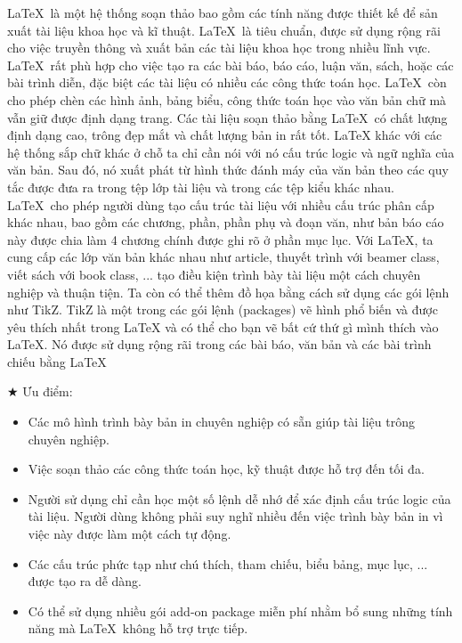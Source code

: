 \documentclass[12pt,a4paper]{report}
\begin{document}
    \LaTeX\  là một hệ thống soạn thảo bao gồm các tính năng được thiết kế để sản xuất tài liệu khoa học và kĩ thuật. \LaTeX\  là tiêu chuẩn, được sử dụng rộng rãi cho việc truyền thông và xuất bản các tài liệu khoa học trong nhiều lĩnh vực.
    \LaTeX\  rất phù hợp cho việc tạo ra các bài báo, báo cáo, luận văn, sách, hoặc các bài trình diễn, đặc biệt các tài liệu có nhiều các công thức toán học. \LaTeX\  còn cho phép chèn các hình ảnh, bảng biểu, công thức toán học vào văn bản chữ mà vẫn giữ được định dạng trang. Các tài liệu soạn thảo bằng \LaTeX\  có chất lượng định dạng cao, trông đẹp mắt và chất lượng bản in rất tốt.
    LaTeX khác với các hệ thống sắp chữ khác ở chỗ ta chỉ cần nói với nó cấu trúc logic và ngữ nghĩa của văn bản. Sau đó, nó xuất phát từ hình thức đánh máy của văn bản theo các quy tắc được đưa ra trong tệp lớp tài liệu và trong các tệp kiểu khác nhau. \LaTeX\  cho phép người dùng tạo cấu trúc tài liệu với nhiều cấu trúc phân cấp khác nhau, bao gồm các chương, phần, phần phụ và đoạn văn, như bản báo cáo này được chia làm 4 chương chính được ghi rõ ở phần mục lục. 
    Với \LaTeX, ta cung cấp các lớp văn bản khác nhau như article, thuyết trình với beamer class, viết sách với book class, ... tạo điều kiện trình bày tài liệu một cách chuyên nghiệp và thuận tiện. Ta còn có thể thêm đồ họa bằng cách sử dụng các gói lệnh như TikZ. TikZ là một trong các gói lệnh (packages) vẽ hình phổ biến và được yêu thích nhất trong LaTeX và có thể cho bạn vẽ bất cứ thứ gì mình thích vào \LaTeX . Nó được sử dụng rộng rãi trong các bài báo, văn bản và các bài trình chiếu bằng \LaTeX\ 
    \begin{center}
    $ \bigstar $ Ưu điểm:
    \end{center}
    \begin{itemize}
    	\item Các mô hình trình bày bản in chuyên nghiệp có sẵn giúp tài liệu trông chuyên nghiệp.
    	\item  Việc soạn thảo các công thức toán học, kỹ thuật được hỗ trợ đến tối đa.
    	\item Người sử dụng chỉ cần học một số lệnh dễ nhớ để xác định cấu trúc logic của tài liệu. Người dùng không phải suy nghĩ nhiều đến việc trình bày bản in vì việc này được làm một cách tự động.
    	\item Các cấu trúc phức tạp như chú thích, tham chiếu, biểu bảng, mục lục, ... được tạo ra dễ dàng.
    	\item Có thể sử dụng nhiều gói add-on package miễn phí nhằm bổ sung những tính năng mà \LaTeX\  không hỗ trợ trực tiếp.
    \end{itemize}
    
\end{document}
